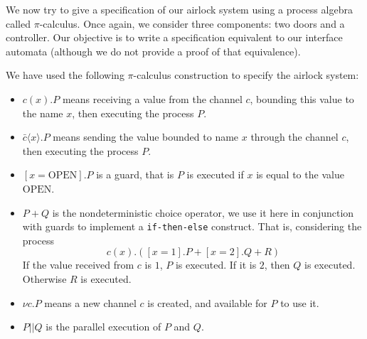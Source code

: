 \begin{example}
  \label{example:sota:airlockprocess}

  We now try to give a specification of our airlock system using a process
  algebra called \( \pi \)-calculus.
  Once again, we consider three components: two doors and a controller.
  Our objective is to write a specification equivalent to our interface automata
  (although we do not provide a proof of that equivalence).

  We have used the following \( \pi \)-calculus construction to specify the
  airlock system:
  \begin{itemize}
  \item \( c(x). P\) means receiving a value from the channel \( c \), bounding
    this value to the name \( x \), then executing the process \( P \).
  \item \( \bar{c} \langle x \rangle . P \) means sending the value bounded to
    name \( x \) through the channel \( c \), then executing the process
    \( P \).
  \item \( [x = \mathrm{OPEN}] . P \) is a guard, that is \( P \) is executed if
    \( x \) is equal to the value \( \mathrm{OPEN} \).
  \item \( P + Q \) is the nondeterministic choice operator, we use it here in
    conjunction with guards to implement a \texttt{if-then-else} construct. That
    is, considering the process
    \[
      c(x) . ([x = 1] . P + [x = 2] . Q + R)
    \]
    If the value received from \( c \) is \( 1 \), \( P \) is executed.
    If it is \( 2 \), then \( Q \) is executed. Otherwise \( R \) is executed.
  \item \( \nu c. P \) means a new channel \( c \) is created, and available for
    \( P \) to use it.
  \item \( P || Q \) is the parallel execution of \( P \) and \( Q \).
  \end{itemize}


\end{example}
